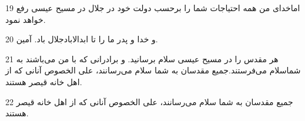 \par 19 اماخدای من همه احتیاجات شما را برحسب دولت خود در جلال در مسیح عیسی رفع خواهد نمود.
\par 20 و خدا و پدر ما را تا ابدالابادجلال باد. آمین.
\par 21 هر مقدس را در مسیح عیسی سلام برسانید. و برادرانی که با من می‌باشند به شماسلام می‌فرستند.جمیع مقدسان به شما سلام می‌رسانند، علی الخصوص آنانی که از اهل خانه قیصر هستند.
\par 22 جمیع مقدسان به شما سلام می‌رسانند، علی الخصوص آنانی که از اهل خانه قیصر هستند.




